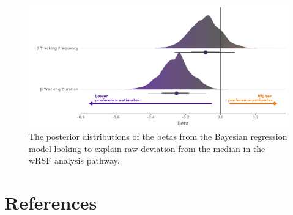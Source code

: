 \documentclass[10pt,a4paper]{article}
\begin{document}
\begin{figure}
\includegraphics[width=1\linewidth]{../figures/wrsf_rEstwrsf_effectsPlot} \caption{The posterior distributions of the betas from the Bayesian regression model looking to explain raw deviation from the median in the wRSF analysis pathway.}\label{fig:rEstBetasWRSF}
\end{figure}

\clearpage

\hypertarget{references}{%
\section*{References}\label{references}}
\end{document}
